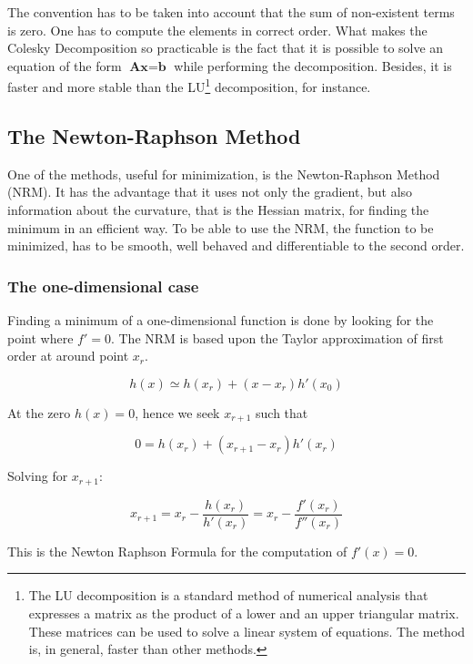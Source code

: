 \documentclass[a4paper,14pt]{extbook}
\begin{document}
The convention has to be taken into account that the sum of non-existent terms is zero. One has to compute the elements in correct order. What makes the Colesky Decomposition so practicable is the fact that it is possible to solve an equation of the form $\textbf{Ax}=\textbf{b}$ while performing the decomposition. Besides, it is faster and more stable than the LU\footnote{The LU decomposition is a standard method of numerical analysis that expresses a matrix as the product of a lower and an upper triangular matrix. These matrices can be used to solve a linear system of equations. The method is, in general, faster than other methods.} decomposition, for instance.
%
\subsection{The Newton-Raphson Method}
One of the methods, useful for minimization, is the Newton-Raphson Method (NRM). It has the advantage that it uses not only the gradient, but also information about the curvature, that is the Hessian matrix, for finding the minimum in an efficient way. To be able to use the NRM, the function to be minimized, has to be smooth, well behaved and differentiable to the second order.

\subsubsection{The one-dimensional case}

Finding a minimum of a one-dimensional function is done by looking for the point where $f'=0$. The NRM is based upon the Taylor approximation of first order at around point $x_r$.

\begin{equation}
h(x)\simeq h(x_r)+(x-x_r)h'(x_0)
\end{equation}

At the zero $h(x)=0$, hence we seek $x_{r+1}$ such that

\begin{equation}
0=h(x_r)+(x_{r+1}-x_r)h'(x_r)
\end{equation}

Solving for $x_{r+1}$:

\begin{equation}
x_{r+1}=x_r-\frac{h(x_r)}{h'(x_r)}=x_r-\frac{f'(x_r)}{f''(x_r)}
\end{equation}

This is the Newton Raphson Formula for the computation of $f'(x)=0$.
\end{document}
